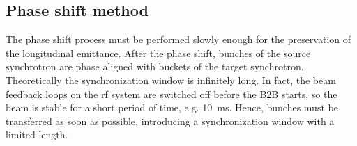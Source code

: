 %
%
%
%

\subsection{Phase shift method}




The phase shift process must be performed slowly enough for the preservation of the longitudinal emittance. After the phase shift, bunches of the source synchrotron are phase aligned with buckets of the target synchrotron. Theoretically the synchronization window is infinitely long. In fact, the beam feedback loops on the rf system are switched off before the B2B starts, so the beam is stable for a short period of time, e.g. \SI{10}{ms}. Hence, bunches must be transferred as soon as possible, introducing a synchronization window with a limited length.

